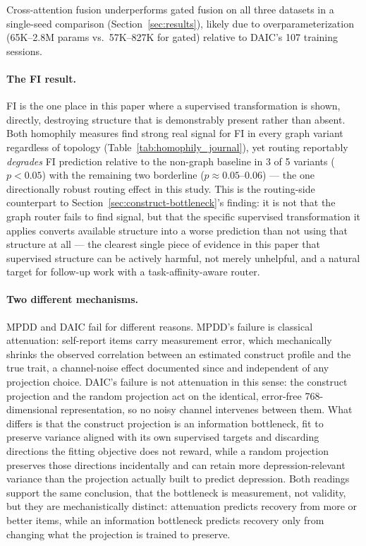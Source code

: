 \documentclass[twocolumn]{article}
\begin{document}
Cross-attention fusion underperforms gated fusion on all three datasets in a single-seed comparison (Section~\ref{sec:results}), likely due to overparameterization (65K--2.8M params vs.\ 57K--827K for gated) relative to DAIC's 107 training sessions.

\paragraph{The FI result.} FI is the one place in this paper where a supervised transformation is shown, directly, destroying structure that is demonstrably present rather than absent. Both homophily measures find strong real signal for FI in every graph variant regardless of topology (Table~\ref{tab:homophily_journal}), yet routing reportably \emph{degrades} FI prediction relative to the non-graph baseline in 3 of 5 variants ($p<0.05$) with the remaining two borderline ($p\approx0.05$--$0.06$) — the one directionally robust routing effect in this study. This is the routing-side counterpart to Section~\ref{sec:construct-bottleneck}'s finding: it is not that the graph router fails to find signal, but that the specific supervised transformation it applies converts available structure into a worse prediction than not using that structure at all — the clearest single piece of evidence in this paper that supervised structure can be actively harmful, not merely unhelpful, and a natural target for follow-up work with a task-affinity-aware router.

\paragraph{Two different mechanisms.} MPDD and DAIC fail for different reasons. MPDD's failure is classical attenuation: self-report items carry measurement error, which mechanically shrinks the observed correlation between an estimated construct profile and the true trait, a channel-noise effect documented since \citet{spearman1904} and independent of any projection choice. DAIC's failure is not attenuation in this sense: the construct projection and the random projection act on the identical, error-free 768-dimensional representation, so no noisy channel intervenes between them. What differs is that the construct projection is an information bottleneck, fit to preserve variance aligned with its own supervised targets and discarding directions the fitting objective does not reward, while a random projection preserves those directions incidentally and can retain more depression-relevant variance than the projection actually built to predict depression. Both readings support the same conclusion, that the bottleneck is measurement, not validity, but they are mechanistically distinct: attenuation predicts recovery from more or better items, while an information bottleneck predicts recovery only from changing what the projection is trained to preserve.
\end{document}
